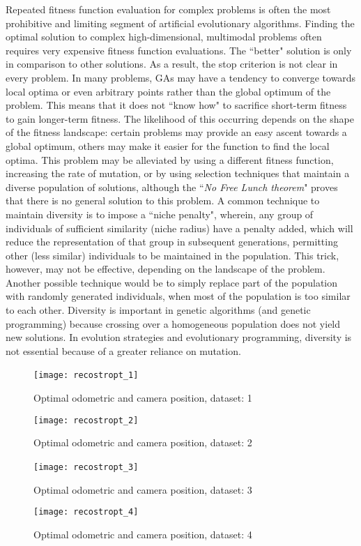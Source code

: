 Repeated fitness function evaluation for complex problems is often the most prohibitive and limiting segment of artificial evolutionary algorithms. Finding the optimal solution to complex high-dimensional, multimodal problems often requires very expensive fitness function evaluations.
The ``better" solution is only in comparison to other solutions. As a result, the stop criterion is not clear in every problem.
In many problems, GAs may have a tendency to converge towards local optima or even arbitrary points rather than the global optimum of the problem. This means that it does not ``know how" to sacrifice short-term fitness to gain longer-term fitness. The likelihood of this occurring depends on the shape of the fitness landscape: certain problems may provide an easy ascent towards a global optimum, others may make it easier for the function to find the local optima. 
This problem may be alleviated by using a different fitness function, increasing the rate of mutation, or by using selection techniques that maintain a diverse population of solutions, although the ``\emph{No Free Lunch theorem}" proves that there is no general solution to this problem. 
A common technique to maintain diversity is to impose a ``niche penalty", wherein, any group of individuals of sufficient similarity (niche radius) have a penalty added, which will reduce the representation of that group in subsequent generations, permitting other (less similar) individuals to be maintained in the population. This trick, however, may not be effective, depending on the landscape of the problem. 
Another possible technique would be to simply replace part of the population with randomly generated individuals, when most of the population is too similar to each other. Diversity is important in genetic algorithms (and genetic programming) because crossing over a homogeneous population does not yield new solutions. 
In evolution strategies and evolutionary programming, diversity is not essential because of a greater reliance on mutation.\columnbreak
\begin{figure}[!h]
   {\texttt{[image: recostropt\_1]}}\,
   \caption{Optimal odometric and camera position, dataset: 1}
   \label{fig:OptiOdo1}
\end{figure}
\begin{figure}[!h]
   {\texttt{[image: recostropt\_2]}}\\
   \caption{Optimal odometric and camera position, dataset: 2}
   \label{fig:OptiOdo2}
\end{figure}
\begin{figure}[!htb]
   {\texttt{[image: recostropt\_3]}}\,
   \caption{Optimal odometric and camera position, dataset: 3}
   \label{fig:OptiOdo3}
\end{figure}
\begin{figure}[!htb]
   {\texttt{[image: recostropt\_4]}}
\caption{Optimal odometric and camera position, dataset: 4}
\label{fig:OptiOdo4}
\end{figure}